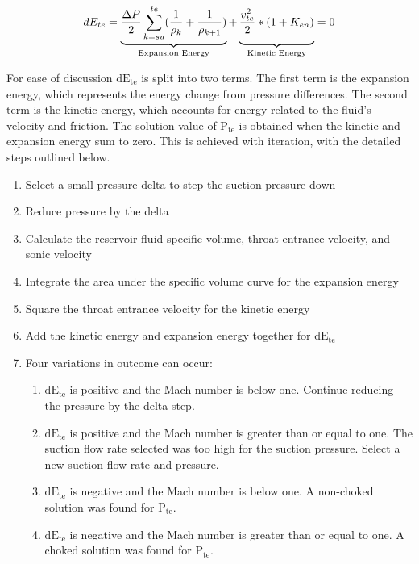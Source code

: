 \documentclass[12 pt]{report}
\newcommand{\dete}{$\mathrm{dE_{te}}$\xspace}  %
\newcommand{\pte}{$\mathrm{P_{te}}$\xspace}  %
\begin{document}
\begin{equation}
dE_{te} = \underbrace{\frac{\Delta P}{2}\sum_{k=su}^{te} (\frac{1}{\rho_{k}} + \frac{1}{\rho_{k+1}})}_{\text{Expansion Energy}} + \underbrace{\vphantom{\sum_{k=su}^{te}}{\frac{v_{te}^{2}}{2} * (1+K_{en})}}_{\text{Kinetic Energy}} = 0
\label{trap_entr}
\end{equation}

For ease of discussion \dete is split into two terms. The first term is the expansion energy, which represents the energy change from pressure differences. The second term is the kinetic energy, which accounts for energy related to the fluid's velocity and friction. The solution value of \pte{} is obtained when the kinetic and expansion energy sum to zero. This is achieved with iteration, with the detailed steps outlined below.
\begin{enumerate}
    \item Select a small pressure delta to step the suction pressure down
    \item Reduce pressure by the delta 
    \item Calculate the reservoir fluid specific volume, throat entrance velocity, and sonic velocity 
    \item Integrate the area under the specific volume curve for the expansion energy
    \item Square the throat entrance velocity for the kinetic energy
    \item Add the kinetic energy and expansion energy together for \dete{}
    \item Four variations in outcome can occur:
    \begin{enumerate}
        \item \dete{} is positive and the Mach number is below one. Continue reducing the pressure by the delta step.
        \item \dete{} is positive and the Mach number is greater than or equal to one. The suction flow rate selected was too high for the suction pressure. Select a new suction flow rate and pressure.
        \item \dete{} is negative and the Mach number is below one. A non-choked solution was found for \pte.
        \item \dete{} is negative and the Mach number is greater than or equal to one. A choked solution was found for \pte.
    \end{enumerate}
\end{enumerate}
\end{document}
